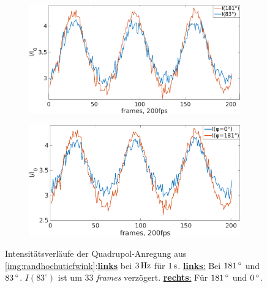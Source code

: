 \documentclass[numbers=noenddot,a4paper,notitlepage,twoside,BCOR15mm]{scrbook}
\newcommand{\degree}{^\circ}
\newcommand{\tilt}[1]{\textit{#1}}
\newcommand{\fett}[1]{\textbf{#1}}
\begin{document}
						\begin{figure}[!t]
							\centering
							\begin{subfigure}{0.49\textwidth}
								\centering
								\includegraphics[width=\textwidth,height=0.65\textwidth]{figs/auswertung/plasmaglw/intens83u180quadinphase3Hz1sek.png}
							\end{subfigure}
							\begin{subfigure}{0.49\textwidth}
								\centering
								\includegraphics[width=\textwidth,height=0.65\textwidth]{figs/auswertung/plasmaglw/intens0u180quad3Hz1sek.png}
							\end{subfigure}
							\caption{Intensitätsverläufe der Quadrupol-Anregung aus \ref{img:randhochutiefwink}:\underline{\fett{links}} bei $\unit[3]{Hz}$ für $\unit[1]{s}$. \underline{\fett{links}:} Bei $\unit[181]{\degree}$ und $\unit[83]{\degree}$. $I\left(83\degree\right)$ ist um 33 \tilt{frames} verzögert. \underline{\fett{rechts}:} Für $\unit[181]{\degree}$  und $\unit[0]{\degree}$. }
							\label{img:intensquadhochwink}
						\end{figure}
\end{document}
